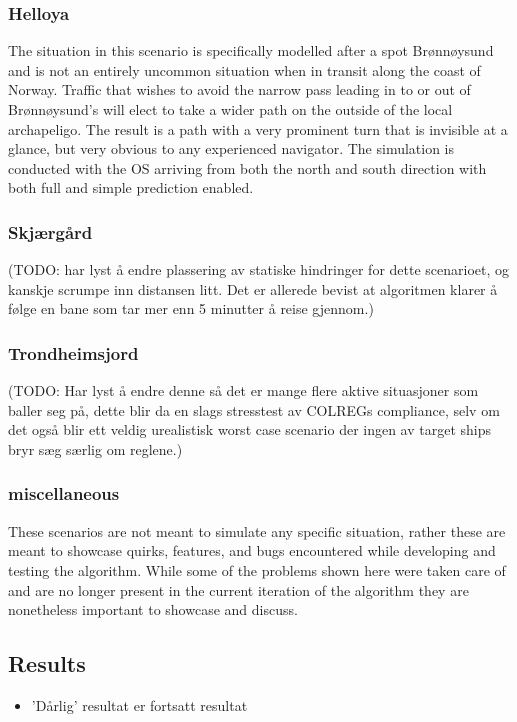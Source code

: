 \subsubsection*{Helloya}
The situation in this scenario is specifically modelled after a spot Brønnøysund and is not an entirely uncommon
situation when in transit along the coast of Norway. Traffic that wishes to avoid the narrow pass leading in to or out of
Brønnøysund's will elect to take a wider path on the outside of the local archapeligo. The result is a path with a very prominent
turn that is invisible at a glance, but very obvious to any experienced navigator. The simulation is conducted with the \gls{OS} arriving
from both the north and south direction with both full and simple prediction enabled. 

\subsubsection*{Skjærgård}
(TODO: har lyst å endre plassering av statiske hindringer for dette scenarioet, og kanskje scrumpe inn distansen litt.
Det er allerede bevist at algoritmen klarer å følge en bane som tar mer enn 5 minutter å reise gjennom.)

\subsubsection*{Trondheimsjord}
(TODO: Har lyst å endre denne så det er mange flere aktive situasjoner som baller seg på, dette blir da en slags stresstest av
COLREGs compliance, selv om det også blir ett veldig urealistisk worst case scenario der ingen av target ships bryr sæg særlig om reglene.)

\subsubsection*{miscellaneous}
These scenarios are not meant to simulate any specific situation, rather these are meant to showcase quirks, features, and bugs
encountered while developing and testing the algorithm. While some of the problems shown here were taken care of and are no longer present in the
current iteration of the algorithm they are nonetheless important to showcase and discuss.


\subsection{Results}
\begin{itemize}
    \item 'Dårlig' resultat er fortsatt resultat
\end{itemize}



